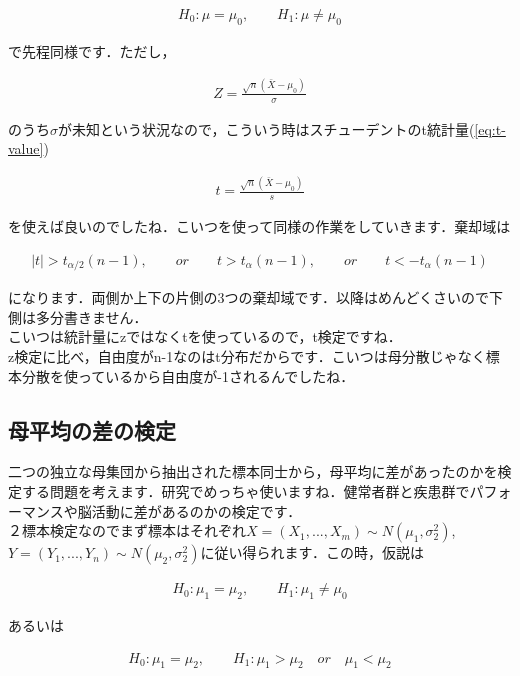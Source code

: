 \documentclass[11pt,a4paper]{ujreport} 	%
\begin{document}
\begin{align}
  H_0 : \mu = \mu_0, \qquad H_1 : \mu \neq \mu_0
\end{align}

で先程同様です．ただし，

\begin{align}
  Z = \frac{\sqrt{n}(\bar{X}-\mu_0)}{\sigma}
\end{align}

のうち$\sigma$が未知という状況なので，こういう時はスチューデントのt統計量(\ref{eq:t-value})

\begin{align}
  t = \frac{\sqrt{n}(\bar{X}-\mu_0)}{s}
\end{align}

を使えば良いのでしたね．こいつを使って同様の作業をしていきます．棄却域は

\begin{align}
  |t| > t_{\alpha/2}(n-1), \qquad or \qquad t>t_\alpha(n-1), \qquad or \qquad t<-t_\alpha(n-1)
\end{align}

になります．両側か上下の片側の3つの棄却域です．以降はめんどくさいので下側は多分書きません．\\

こいつは統計量にzではなくtを使っているので，t検定ですね．\\

z検定に比べ，自由度がn-1なのはt分布だからです．こいつは母分散じゃなく標本分散を使っているから自由度が-1されるんでしたね．

\subsection{母平均の差の検定}
二つの独立な母集団から抽出された標本同士から，母平均に差があったのかを検定する問題を考えます．研究でめっちゃ使いますね．健常者群と疾患群でパフォーマンスや脳活動に差があるのかの検定です．\\

２標本検定なのでまず標本はそれぞれ$X=(X_1,...,X_m) \sim N(\mu_1, \sigma_2^2)$, $Y=(Y_1,...,Y_n) \sim N(\mu_2, \sigma_2^2)$に従い得られます．この時，仮説は

\begin{align}
  H_0 : \mu_1 = \mu_2, \qquad H_1 : \mu_1 \neq \mu_0
\end{align}

あるいは

\begin{align}
  H_0 : \mu_1 = \mu_2, \qquad H_1 : \mu_1 > \mu_2 \quad or\quad \mu_1 < \mu_2
\end{align}
\end{document}

